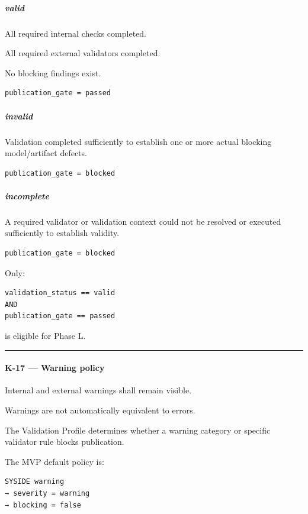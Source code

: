 \hypertarget{valid}{%
\subparagraph{valid}\label{valid}}

All required internal checks completed.

All required external validators completed.

No blocking findings exist.

\begin{verbatim}
publication_gate = passed
\end{verbatim}

\hypertarget{invalid}{%
\subparagraph{invalid}\label{invalid}}

Validation completed sufficiently to establish one or more actual blocking model/artifact defects.

\begin{verbatim}
publication_gate = blocked
\end{verbatim}

\hypertarget{incomplete}{%
\subparagraph{incomplete}\label{incomplete}}

A required validator or validation context could not be resolved or executed sufficiently to establish validity.

\begin{verbatim}
publication_gate = blocked
\end{verbatim}

Only:

\begin{verbatim}
validation_status == valid
AND
publication_gate == passed
\end{verbatim}

is eligible for Phase L.

\begin{center}\rule{0.5\linewidth}{0.5pt}\end{center}

\hypertarget{k-17--warning-policy}{%
\paragraph{K-17 --- Warning policy}\label{k-17--warning-policy}}

Internal and external warnings shall remain visible.

Warnings are not automatically equivalent to errors.

The Validation Profile determines whether a warning category or specific validator rule blocks publication.

The MVP default policy is:

\begin{verbatim}
SYSIDE warning
→ severity = warning
→ blocking = false
\end{verbatim}

